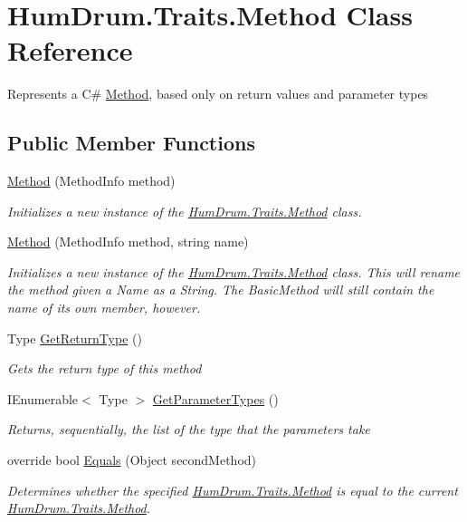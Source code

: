\hypertarget{classHumDrum_1_1Traits_1_1Method}{}\section{Hum\+Drum.\+Traits.\+Method Class Reference}
\label{classHumDrum_1_1Traits_1_1Method}


Represents a C\# \hyperlink{classHumDrum_1_1Traits_1_1Method}{Method}, based only on return values and parameter types  


\subsection*{Public Member Functions}
\begin{DoxyCompactItemize}
\item 
\hyperlink{classHumDrum_1_1Traits_1_1Method_a459d9bc4db6e1d1572d1f34fb92c19d1}{Method} (Method\+Info method)
\begin{DoxyCompactList}\small\item\em Initializes a new instance of the \hyperlink{classHumDrum_1_1Traits_1_1Method}{Hum\+Drum.\+Traits.\+Method} class. \end{DoxyCompactList}\item 
\hyperlink{classHumDrum_1_1Traits_1_1Method_ac822929c7b6871193f958fcd223e2693}{Method} (Method\+Info method, string name)
\begin{DoxyCompactList}\small\item\em Initializes a new instance of the \hyperlink{classHumDrum_1_1Traits_1_1Method}{Hum\+Drum.\+Traits.\+Method} class. This will rename the method given a Name as a String. The Basic\+Method will still contain the name of its own member, however. \end{DoxyCompactList}\item 
Type \hyperlink{classHumDrum_1_1Traits_1_1Method_af33783f5c6033774bcba1e5900e760be}{Get\+Return\+Type} ()
\begin{DoxyCompactList}\small\item\em Gets the return type of this method \end{DoxyCompactList}\item 
I\+Enumerable$<$ Type $>$ \hyperlink{classHumDrum_1_1Traits_1_1Method_a320f9c87cdb137fca994215039c03904}{Get\+Parameter\+Types} ()
\begin{DoxyCompactList}\small\item\em Returns, sequentially, the list of the type that the parameters take \end{DoxyCompactList}\item 
override bool \hyperlink{classHumDrum_1_1Traits_1_1Method_af987deddb250dbf81c7e08866c5dce9d}{Equals} (Object second\+Method)
\begin{DoxyCompactList}\small\item\em Determines whether the specified \hyperlink{classHumDrum_1_1Traits_1_1Method}{Hum\+Drum.\+Traits.\+Method} is equal to the current \hyperlink{classHumDrum_1_1Traits_1_1Method}{Hum\+Drum.\+Traits.\+Method}. \end{DoxyCompactList}\end{DoxyCompactItemize}
